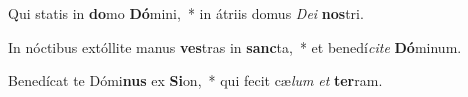 \item Qui statis in \textbf{do}mo \textbf{Dó}mini,~* in átriis domus \textit{De}\textit{i} \textbf{nos}tri.
\item In nóctibus extóllite manus \textbf{ves}tras in \textbf{sanc}ta,~* et benedí\textit{ci}\textit{te} \textbf{Dó}minum.
\item Benedícat te Dómi\textbf{nus} ex \textbf{Si}on,~* qui fecit cæ\textit{lum} \textit{et} \textbf{ter}ram.
